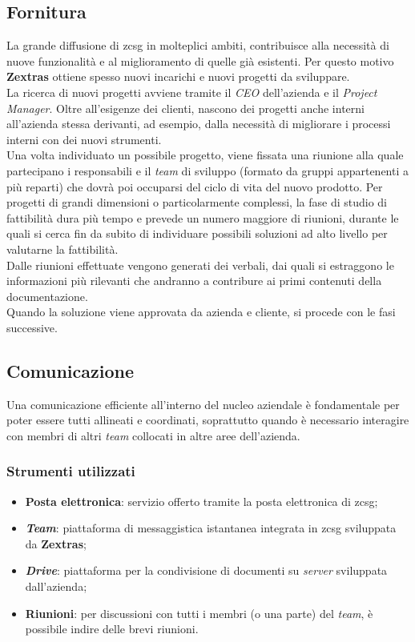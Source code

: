     \subsection{Fornitura}
        La grande diffusione di \gls{zcsg} in molteplici ambiti, contribuisce alla necessità di nuove funzionalità e al miglioramento di quelle già esistenti. Per questo motivo \textbf{Zextras} ottiene spesso nuovi incarichi e nuovi progetti da sviluppare. \\
        La ricerca di nuovi progetti avviene tramite il \textit{CEO} dell'azienda e il \textit{Project Manager}. Oltre all'esigenze dei clienti, nascono dei progetti anche interni all'azienda stessa derivanti, ad esempio, dalla necessità di migliorare i processi interni con dei nuovi strumenti. \\
        Una volta individuato un possibile progetto, viene fissata una riunione alla quale partecipano i responsabili e il \textit{team} di sviluppo (formato da gruppi appartenenti a più reparti) che dovrà poi occuparsi del ciclo di vita del nuovo prodotto. Per progetti di grandi dimensioni o particolarmente complessi, la fase di studio di fattibilità dura più tempo e prevede un numero maggiore di riunioni, durante le quali si cerca fin da subito di individuare possibili soluzioni ad alto livello per valutarne la fattibilità. \\
        Dalle riunioni effettuate vengono generati dei verbali, dai quali si estraggono le informazioni più rilevanti che andranno a contribure ai primi contenuti della documentazione. \\
        Quando la soluzione viene approvata da azienda e cliente, si procede con le fasi successive.
    \subsection{Comunicazione}
        Una comunicazione efficiente all'interno del nucleo aziendale è fondamentale per poter essere tutti allineati e coordinati, soprattutto quando è necessario interagire con membri di altri \textit{team} collocati in altre aree dell'azienda.
        \subsubsection{Strumenti utilizzati}
        \begin{itemize}
            \item \textbf{Posta elettronica}: servizio offerto tramite la posta elettronica di \gls{zcsg};
            \item \textit{\textbf{Team}}: piattaforma di messaggistica istantanea integrata in \gls{zcsg} sviluppata da \textbf{Zextras};
            \item \textit{\textbf{Drive}}: piattaforma per la condivisione di documenti su \textit{server} sviluppata dall'azienda;
            \item \textbf{Riunioni}: per discussioni con tutti i membri (o una parte) del \textit{team}, è possibile indire delle brevi riunioni.
        \end{itemize}

